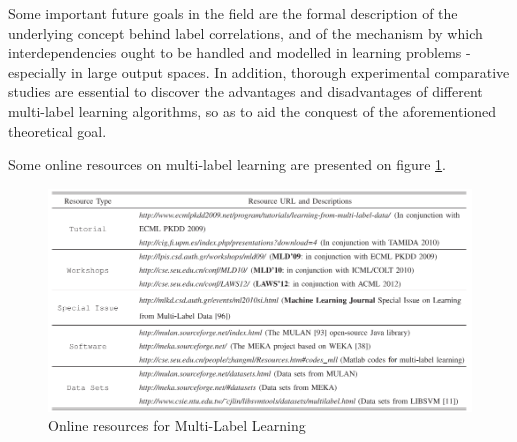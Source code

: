 \documentclass[12pt]{report}
\begin{document}
  
  Some important future goals in the field are the formal description of the
  underlying concept behind label correlations, and of the mechanism by which interdependencies ought to
  be handled and modelled in learning problems - especially in large output spaces. 
  In addition, thorough experimental comparative studies are essential to
  discover the advantages and disadvantages of different multi-label learning
  algorithms, so as to aid the conquest of the aforementioned theoretical goal.

  Some online resources on multi-label learning are presented on figure \ref{figure:resources}.
	
	\begin{figure}[H]
		\centering
		\includegraphics[width=1\textwidth]{online.png}
		\caption{Online resources for Multi-Label Learning}
    \label{figure:resources}
	\end{figure}
	
\end{document}
